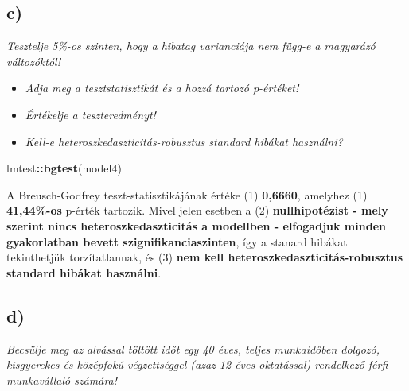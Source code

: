 \documentclass[
]{article}
\newenvironment{Shaded}{\begin{snugshade}}{\end{snugshade}}
\newcommand{\DataTypeTok}[1]{\textcolor[rgb]{0.13,0.29,0.53}{#1}}
\newcommand{\DecValTok}[1]{\textcolor[rgb]{0.00,0.00,0.81}{#1}}
\newcommand{\KeywordTok}[1]{\textcolor[rgb]{0.13,0.29,0.53}{\textbf{#1}}}
\newcommand{\NormalTok}[1]{#1}
\newcommand{\OperatorTok}[1]{\textcolor[rgb]{0.81,0.36,0.00}{\textbf{#1}}}
\newcommand{\StringTok}[1]{\textcolor[rgb]{0.31,0.60,0.02}{#1}}
\providecommand{\tightlist}{%
  \setlength{\itemsep}{0pt}\setlength{\parskip}{0pt}}
\begin{document}
\hypertarget{c-1}{%
\subsection{c)}\label{c-1}}

\emph{Tesztelje 5\%-os szinten, hogy a hibatag varianciája nem függ-e a
magyarázó változóktól!}

\begin{itemize}
\tightlist
\item
  \emph{Adja meg a tesztstatisztikát és a hozzá tartozó p-értéket!}
\item
  \emph{Értékelje a teszteredményt!}
\item
  \emph{Kell-e heteroszkedaszticitás-robusztus standard hibákat
  használni?}
\end{itemize}

\begin{Shaded}
\begin{Highlighting}[]
\NormalTok{lmtest}\OperatorTok{::}\KeywordTok{bgtest}\NormalTok{(model4)}
\end{Highlighting}
\end{Shaded}

A Breusch-Godfrey teszt-statisztikájának értéke (1) \textbf{0,6660},
amelyhez (1) \textbf{41,44\%-os} p-érték tartozik. Mivel jelen esetben a
(2) \textbf{nullhipotézist - mely szerint nincs heteroszkedaszticitás a
modellben - elfogadjuk minden gyakorlatban bevett
szignifikanciaszinten}, így a stanard hibákat tekinthetjük
torzítatlannak, és (3) \textbf{nem kell heteroszkedaszticitás-robusztus
standard hibákat használni}.

\hypertarget{d-1}{%
\subsection{d)}\label{d-1}}

\emph{Becsülje meg az alvással töltött időt egy 40 éves, teljes
munkaidőben dolgozó, kisgyerekes és középfokú végzettséggel (azaz 12
éves oktatással) rendelkező férfi munkavállaló számára!}

\begin{Shaded}
\end{Shaded}
\end{document}
